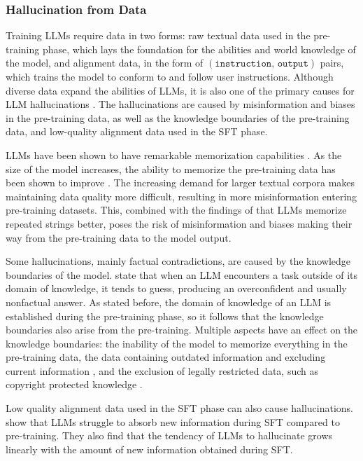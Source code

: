 \documentclass[english, 12pt, a4paper, sci, utf8, a-2b, online]{latex/definitions/aaltothesis}
\begin{document}
\subsubsection{Hallucination from Data} \label{sec:data_hallucination}

Training LLMs require data in two forms: raw textual data used in the pre-training phase, which lays the foundation for the abilities and world knowledge of the model, and alignment data, in the form of $(\texttt{instruction, output})$ pairs, which trains the model to conform to and follow user instructions. Although diverse data expand the abilities of LLMs, it is also one of the primary causes for LLM hallucinations \cite{Kalai2025-fl}. The hallucinations are caused by misinformation and biases in the pre-training data, as well as the knowledge boundaries of the pre-training data, and low-quality alignment data used in the SFT phase.

LLMs have been shown to have remarkable memorization capabilities \cite{carlini2023quantifyingmemorizationneurallanguage}. As the size of the model increases, the ability to memorize the pre-training data has been shown to improve \cite{JMLR:v24:22-1144}. The increasing demand for larger textual corpora makes maintaining data quality more difficult, resulting in more misinformation entering pre-training datasets. This, combined with the findings of \textcite{carlini2023quantifyingmemorizationneurallanguage} that LLMs memorize repeated strings better, poses the risk of misinformation and biases making their way from the pre-training data to the model output.

Some hallucinations, mainly factual contradictions, are caused by the knowledge boundaries of the model. \textcite{Kalai2025-fl} state that when an LLM encounters a task outside of its domain of knowledge, it tends to guess, producing an overconfident and usually nonfactual answer. As stated before, the domain of knowledge of an LLM is established during the pre-training phase, so it follows that the knowledge boundaries also arise from the pre-training. Multiple aspects have an effect on the knowledge boundaries: the inability of the model to memorize everything in the pre-training data, the data containing outdated information and excluding current information  \cite{onoe-etal-2022-entity}, and the exclusion of legally restricted data, such as copyright protected knowledge \cite{min2024silolanguagemodelsisolating}.

Low quality alignment data used in the SFT phase can also cause hallucinations. \textcite{gekhman2024doesfinetuningllmsnew} show that LLMs struggle to absorb new information during SFT compared to pre-training. They also find that the tendency of LLMs to hallucinate grows linearly with the amount of new information obtained during SFT.
\end{document}
